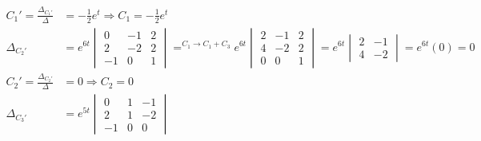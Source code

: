 \documentclass{article}
\DeclareMathOperator*{\equals}{=}
\begin{document}
\begin{align*}
    C_1'=\frac{\Delta_{C_1'}}{\Delta} & = -\frac{1}{2}e^{t} \Rightarrow C_1=-\frac{1}{2}e^{t}                                                                                           \\
    \Delta_{C_2'}                     & =e^{6t}\begin{vmatrix}
                                                   0  & -1 & 2 \\
                                                   2  & -2 & 2 \\
                                                   -1 & 0  & 1
                                               \end{vmatrix}\equals^{C_1\rightarrow C_1+C_3}e^{6t}\begin{vmatrix}
                                                                                                      2 & -1 & 2 \\
                                                                                                      4 & -2 & 2 \\
                                                                                                      0 & 0  & 1
                                                                                                  \end{vmatrix}=e^{6t}\begin{vmatrix}
                                                                                                                          2 & -1 \\
                                                                                                                          4 & -2
                                                                                                                      \end{vmatrix}=e^{6t}(0)=0                                         \\
    C_2'=\frac{\Delta_{C_2'}}{\Delta} & = 0 \Rightarrow C_2=0                                                                                                                           \\
    \Delta_{C_3'}                     & =e^{5t}\begin{vmatrix}
                                                   0  & 1 & -1 \\
                                                   2  & 1 & -2 \\
                                                   -1 & 0 & 0

\end{vmatrix}
\end{align*}
\end{document}
